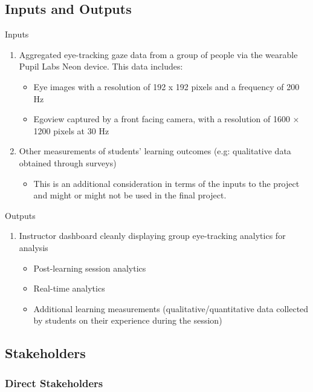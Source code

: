 \documentclass{article}
\begin{document}
\subsection{Inputs and Outputs}
Inputs 
\begin{enumerate}
    \item Aggregated eye-tracking gaze data from a group of people via the wearable Pupil Labs Neon device. This data includes: 
    \begin{itemize}
        \item Eye images with a resolution of 192 x 192 pixels and a frequency of 200 Hz 
        \item Egoview captured by a front facing camera, with a resolution of 1600 × 1200 pixels at 30 Hz
    \end{itemize}
    \item Other measurements of students’ learning outcomes (e.g: qualitative data obtained through surveys) 
    \begin{itemize}
        \item This is an additional consideration in terms of the inputs to the project and might or might not be used in the final project.  
    \end{itemize}
\end{enumerate}  
Outputs
\begin{enumerate}
    \item Instructor dashboard cleanly displaying group eye-tracking analytics for analysis
        \begin{itemize}
            \item Post-learning session analytics 
            \item Real-time analytics
            \item Additional learning measurements (qualitative/quantitative data collected by students on their experience during the session)
        \end{itemize}
\end{enumerate}  

\subsection{Stakeholders}

\subsubsection*{Direct Stakeholders}
\end{document}
